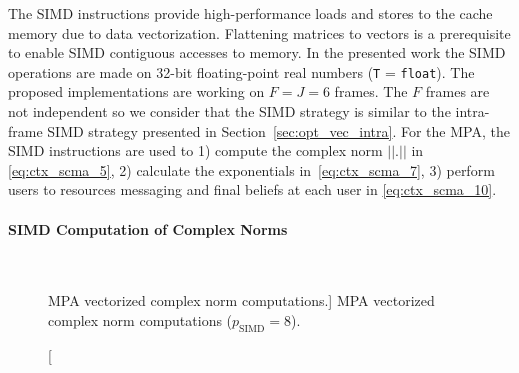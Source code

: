 The SIMD instructions provide high-performance loads and stores to the cache
memory due to data vectorization. Flattening matrices to vectors is a
prerequisite to enable SIMD contiguous accesses to memory. In the presented work
the SIMD operations are made on 32-bit floating-point real numbers (\verb|T| =
\verb|float|). The proposed implementations are working on $F = J = 6$ frames.
The $F$ frames are not independent so we consider that the SIMD strategy is
similar to the intra-frame SIMD strategy presented in
Section~\ref{sec:opt_vec_intra}.
For the MPA, the SIMD instructions are used to 1) compute the complex norm
$||.||$ in \eqref{eq:ctx_scma_5}, 2) calculate the exponentials
in~\eqref{eq:ctx_scma_7}, 3) perform users to resources messaging and final
beliefs at each user in \eqref{eq:ctx_scma_10}.

\paragraph{SIMD Computation of Complex Norms}

\begin{figure}[htp]
  \centering
  \\
  \caption
    [MPA vectorized complex norm computations.]
    {MPA vectorized complex norm computations ($p_\text{SIMD} = 8$).}
  \label{fig:opt_scma_simd_norm}
\end{figure}

